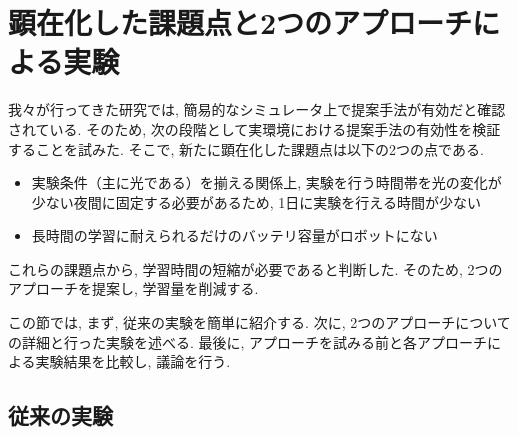
\section{顕在化した課題点と2つのアプローチによる実験}
我々が行ってきた研究\cite{mech}では, 簡易的なシミュレータ上で提案手法が有効だと確認されている. そのため, 次の段階として実環境における提案手法の有効性を検証することを試みた. そこで, 新たに顕在化した課題点は以下の2つの点である.

\begin{itemize}
  \item 実験条件（主に光である）を揃える関係上, 実験を行う時間帯を光の変化が少ない夜間に固定する必要があるため, 1日に実験を行える時間が少ない
  \item 長時間の学習に耐えられるだけのバッテリ容量がロボットにない
\end{itemize}

これらの課題点から, 学習時間の短縮が必要であると判断した. そのため, 2つのアプローチを提案し, 学習量を削減する.
\par
この節では, まず, 従来の実験を簡単に紹介する. 次に, 2つのアプローチについての詳細と行った実験を述べる. 最後に, アプローチを試みる前と各アプローチによる実験結果を比較し, 議論を行う.

\subsection{従来の実験}

